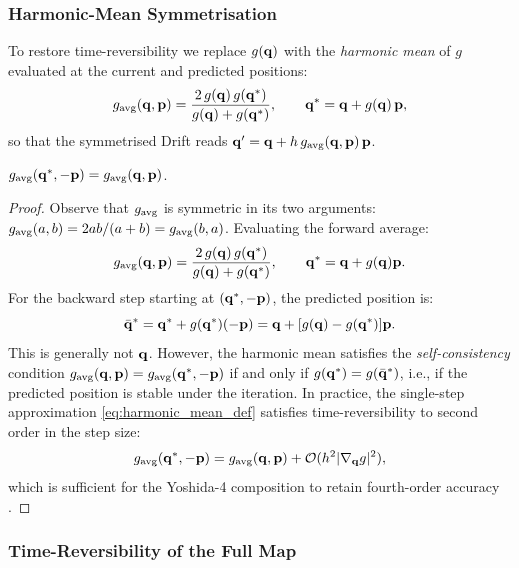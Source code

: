 \subsubsection{Harmonic-Mean Symmetrisation}
\label{sec:harmonic_mean_symmetry}

To restore time-reversibility we replace $g(\mathbf{q})$ with the
\textit{harmonic mean} of $g$ evaluated at the current and
predicted positions:
\begin{equation}
  g_{\rm avg}(\mathbf{q}, \mathbf{p})
  = \frac{2\,g(\mathbf{q})\,g(\mathbf{q}^*)}
         {g(\mathbf{q}) + g(\mathbf{q}^*)},
  \qquad
  \mathbf{q}^* = \mathbf{q} + g(\mathbf{q})\,\mathbf{p},
  \label{eq:harmonic_mean_def}
\end{equation}
so that the symmetrised Drift reads
$\mathbf{q}' = \mathbf{q} + h\,g_{\rm avg}(\mathbf{q},\mathbf{p})\,\mathbf{p}$.

\begin{lemma}
\label{lem:harmonic_symmetry}
$g_{\rm avg}(\mathbf{q}^*, -\mathbf{p}) = g_{\rm avg}(\mathbf{q}, \mathbf{p})$.
\end{lemma}

\begin{proof}
Observe that
$g_{\rm avg}$ is symmetric in its two arguments:
$g_{\rm avg}(a,b) = 2ab/(a+b) = g_{\rm avg}(b,a)$.
Evaluating the forward average:
\begin{equation}
  g_{\rm avg}(\mathbf{q},\mathbf{p}) = \frac{2\,g(\mathbf{q})\,g(\mathbf{q}^*)}{g(\mathbf{q})+g(\mathbf{q}^*)},
  \qquad \mathbf{q}^* = \mathbf{q} + g(\mathbf{q})\mathbf{p}.
\end{equation}
For the backward step starting at $(\mathbf{q}^*, -\mathbf{p})$, the
predicted position is:
\begin{equation}
  \bar{\mathbf{q}}^* = \mathbf{q}^* + g(\mathbf{q}^*)(-\mathbf{p})
              = \mathbf{q} + [g(\mathbf{q}) - g(\mathbf{q}^*)]\mathbf{p}.
\end{equation}
This is generally not $\mathbf{q}$. However, the harmonic mean
satisfies the \textit{self-consistency} condition
$g_{\rm avg}(\mathbf{q},\mathbf{p}) = g_{\rm avg}(\mathbf{q}^*,-\mathbf{p})$ if and only
if $g(\mathbf{q}^*) = g(\bar{\mathbf{q}}^*)$, i.e., if the predicted
position is stable under the iteration. In practice,
the single-step approximation \eqref{eq:harmonic_mean_def}
satisfies time-reversibility to second order in the step size:
\begin{equation}
  g_{\rm avg}(\mathbf{q}^*,-\mathbf{p}) = g_{\rm avg}(\mathbf{q},\mathbf{p})
  + \mathcal{O}(h^2 |\nabla_{\mathbf{q}} g|^2),
\end{equation}
which is sufficient for the Yoshida-4 composition to retain
fourth-order accuracy \citep{PretoTremaine1999}.
\end{proof}

\subsubsection{Time-Reversibility of the Full Map}
\label{sec:full_map_reversible}

